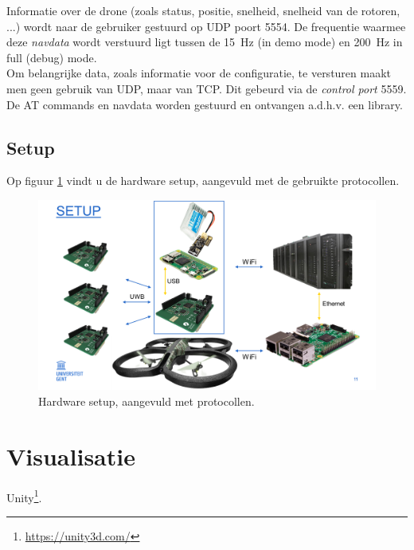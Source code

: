 Informatie over de drone (zoals status, positie, snelheid, snelheid van de rotoren, ...) wordt naar de gebruiker gestuurd op UDP poort 5554.
De frequentie waarmee deze \textit{navdata} wordt verstuurd ligt tussen de \SI{15}{\Hz} (in demo mode) en \SI{200}{\Hz} in full (debug) mode.\\
Om belangrijke data, zoals informatie voor de configuratie, te versturen maakt men geen gebruik van UDP, maar van TCP.
Dit gebeurd via de \textit{control port} 5559. \cite{developer_guide2012}\\
De AT commands en navdata worden gestuurd en ontvangen a.d.h.v. een library.

\subsection{Setup} \label{sec:setup}
Op figuur \ref{fig:setup} vindt u de hardware setup, aangevuld met de gebruikte protocollen.
\begin{figure}[p]
	\centering
	\includegraphics[width=\textwidth]{Setup}
	\caption[Setup]{Hardware setup, aangevuld met protocollen.}
	\label{fig:setup}
\end{figure}

\section{Visualisatie} \label{sec:visualization}
Unity\footnote{\url{https://unity3d.com/}}.